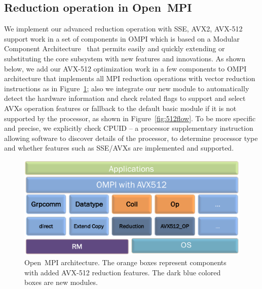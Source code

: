 \documentclass[sigconf]{acmart}
\newcommand{\ompi}[0]{Open~MPI\xspace}
\begin{document}
\subsection{Reduction operation in \ompi}
We implement our advanced reduction operation with SSE, AVX2, AVX-512 support work
in a set of components in OMPI which is based on a Modular Component
Architecture~\cite{dong_prrte} that permits easily and quickly extending or
substituting the core subsystem with new features and innovations.
As shown below, we add our AVX-512 optimization work in a few components to OMPI
architecture that implements all MPI reduction operations with vector reduction instructions as in Figure~\ref{fig:avx_mca}; also we integrate our new module to
automatically detect the hardware information and check related flags to support and select AVXs operation
features or fallback to the default basic module if it is not supported by the
processor, as shown in Figure~\ref{fig:512flow}. To be more specific and precise, we explicitly check CPUID -- a processor
supplementary instruction allowing software to discover details of the processor, to
determine processor type and whether features such as SSE/AVXs are implemented and supported.

\begin{figure}[h]
    \centering
    \includegraphics[width=\linewidth]{avx-mca.pdf}
    \caption{\ompi architecture. The orange boxes represent components with added AVX-512 reduction features. The dark blue colored boxes are new modules.}
    \label{fig:avx_mca}
\end{figure}
\end{document}
